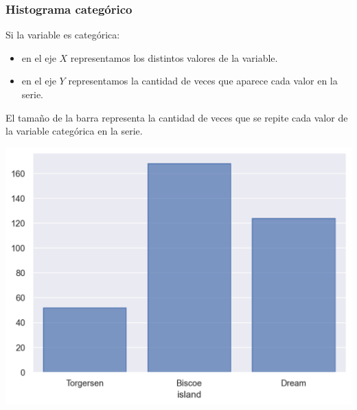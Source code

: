 \documentclass[aspectratio=169,12pt]{beamer}
\begin{document}

\begin{frame}
\frametitle{Histograma categórico}

\begin{minipage}{.55\textwidth}
Si la variable es categórica:
\begin{itemize}
\item en el eje $X$ representamos los distintos valores de la variable.
\item en el eje $Y$ representamos la cantidad de veces que aparece cada valor en la serie.
\end{itemize}

El tamaño de la barra representa la cantidad de veces que se repite cada valor de la variable categórica en la serie.

\end{minipage} \hspace{1cm} %
\begin{minipage}{.35\textwidth}
\begin{center}
\includegraphics[scale=0.30]{clase4-histograma_categorico.png}
\end{center}
\end{minipage}

\end{frame}

\end{document}
